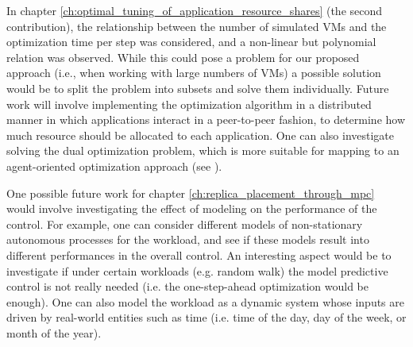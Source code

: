 In chapter \ref{ch:optimal_tuning_of_application_resource_shares} (the second contribution), the relationship between the number of simulated VMs and the optimization time per step was considered, and a non-linear but polynomial relation was observed. While this could pose a problem for our proposed approach (i.e., when working with large numbers of VMs) a possible solution would be to split the problem into subsets and solve them individually. Future work will involve implementing the optimization algorithm in a distributed manner in which applications interact in a peer-to-peer fashion, to determine how much resource should be allocated to each application. One can also investigate solving the dual optimization problem, which is more suitable for mapping to an agent-oriented optimization approach (see \cite{huang_macroeconomics_2008,izakian_auction_2010}).  


One possible future work for chapter \ref{ch:replica_placement_through_mpc} would involve investigating the effect of modeling on the performance of the control. For example, one can consider different models of non-stationary autonomous processes for the workload, and see if these models result into different performances in the overall control. An interesting aspect would be to investigate if under certain workloads (e.g. random walk) the model predictive control is not really needed (i.e. the one-step-ahead optimization would be enough).  
One can also model the workload as a dynamic system whose inputs are driven by real-world entities such as time (i.e. time of the day, day of the week, or month of the year).   

